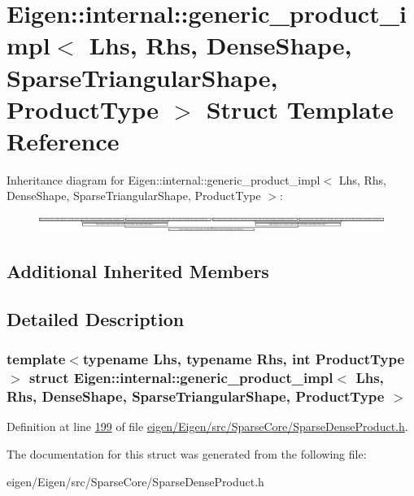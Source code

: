 \hypertarget{struct_eigen_1_1internal_1_1generic__product__impl_3_01_lhs_00_01_rhs_00_01_dense_shape_00_01_sp47812b7c46d160bb7782b8c6e085fdfe}{}\section{Eigen\+:\+:internal\+:\+:generic\+\_\+product\+\_\+impl$<$ Lhs, Rhs, Dense\+Shape, Sparse\+Triangular\+Shape, Product\+Type $>$ Struct Template Reference}
\label{struct_eigen_1_1internal_1_1generic__product__impl_3_01_lhs_00_01_rhs_00_01_dense_shape_00_01_sp47812b7c46d160bb7782b8c6e085fdfe}
Inheritance diagram for Eigen\+:\+:internal\+:\+:generic\+\_\+product\+\_\+impl$<$ Lhs, Rhs, Dense\+Shape, Sparse\+Triangular\+Shape, Product\+Type $>$\+:\begin{figure}[H]
\begin{center}
\leavevmode
\includegraphics[height=0.532995cm]{struct_eigen_1_1internal_1_1generic__product__impl_3_01_lhs_00_01_rhs_00_01_dense_shape_00_01_sp47812b7c46d160bb7782b8c6e085fdfe}
\end{center}
\end{figure}
\subsection*{Additional Inherited Members}


\subsection{Detailed Description}
\subsubsection*{template$<$typename Lhs, typename Rhs, int Product\+Type$>$\newline
struct Eigen\+::internal\+::generic\+\_\+product\+\_\+impl$<$ Lhs, Rhs, Dense\+Shape, Sparse\+Triangular\+Shape, Product\+Type $>$}



Definition at line \hyperlink{eigen_2_eigen_2src_2_sparse_core_2_sparse_dense_product_8h_source_l00199}{199} of file \hyperlink{eigen_2_eigen_2src_2_sparse_core_2_sparse_dense_product_8h_source}{eigen/\+Eigen/src/\+Sparse\+Core/\+Sparse\+Dense\+Product.\+h}.



The documentation for this struct was generated from the following file\+:\begin{DoxyCompactItemize}
\item 
eigen/\+Eigen/src/\+Sparse\+Core/\+Sparse\+Dense\+Product.\+h\end{DoxyCompactItemize}
